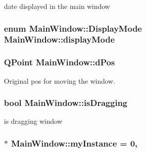 date displayed in the main window 

\subsubsection[{\texorpdfstring{display\+Mode}{displayMode}}]{\setlength{\rightskip}{0pt plus 5cm}enum {\bf Main\+Window\+::\+Display\+Mode}  Main\+Window\+::display\+Mode\hspace{0.3cm}{\ttfamily [private]}}\hypertarget{classMainWindow_a3408763a676b4754ed8f3de394d9c70b}{}\label{classMainWindow_a3408763a676b4754ed8f3de394d9c70b}
\subsubsection[{\texorpdfstring{d\+Pos}{dPos}}]{\setlength{\rightskip}{0pt plus 5cm}Q\+Point Main\+Window\+::d\+Pos\hspace{0.3cm}{\ttfamily [private]}}\hypertarget{classMainWindow_a98499e8e85458e2dc2ac349964230983}{}\label{classMainWindow_a98499e8e85458e2dc2ac349964230983}


Original pos for moving the window. 

\subsubsection[{\texorpdfstring{is\+Dragging}{isDragging}}]{\setlength{\rightskip}{0pt plus 5cm}bool Main\+Window\+::is\+Dragging\hspace{0.3cm}{\ttfamily [private]}}\hypertarget{classMainWindow_ab664d23548b84c308cc3809c1e63aaff}{}\label{classMainWindow_ab664d23548b84c308cc3809c1e63aaff}


is dragging window 

\subsubsection[{\texorpdfstring{my\+Instance}{myInstance}}]{ $\ast$ Main\+Window\+::my\+Instance = 0\hspace{0.3cm}{\ttfamily [static]}, {\ttfamily [private]}}\hypertarget{classMainWindow_a40d454c031dd2ff6a4813fb298c79905}{}\label{classMainWindow_a40d454c031dd2ff6a4813fb298c79905}

